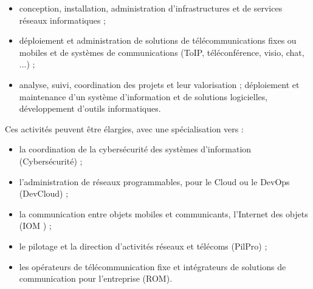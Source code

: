 \medskip
\begin{itemize}[leftmargin=5ex]
\item conception, installation, administration d'infrastructures et de services réseaux informatiques ;
\item déploiement et administration de  solutions de télécommunications fixes ou mobiles et de systèmes de communi\-cations (ToIP, téléconférence, visio, chat, ...) ;
\item analyse, suivi, coordination des projets et leur valorisation ;
déploiement et maintenance d'un système d'infor\-mation et de solutions logicielles, développement d'outils informatiques.
\end{itemize}

\medskip
Ces activités peuvent être élargies, avec une  spécialisation vers : 

\medskip
\begin{itemize}[leftmargin=5ex]
	\item la coordination de la cybersécurité des systèmes d'information (Cybersécurité) ;
	\item l'administration de réseaux programmables, pour le Cloud ou le DevOps (DevCloud) ;
	\item la communication entre objets mobiles et communicants, l'Internet des objets (IOM ) ;
	\item le pilotage et la direction d'activités réseaux et télécoms (PilPro) ;
	\item les opérateurs de télécommunication fixe et intégrateurs de solutions de communication pour l'entreprise (ROM).
\end{itemize}